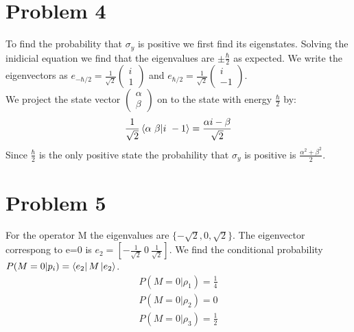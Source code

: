 \documentclass[a4paper,12pt]{article}
\numberwithin{equation}{section}
\begin{document}
\section{Problem 4}
To find the probability that $\sigma_y$ is positive we first find its eigenstates.
Solving the inidicial equation we find that the eigenvalues are $\pm\frac{\hbar}{2}$ as expected.
We write the eigenvectors as $e_{-\hbar/2}=\frac{1}{\sqrt{2}}\left( \begin{smallmatrix}i\\1\end{smallmatrix} \right)$
and $e_{\hbar/2}=\frac{1}{\sqrt{2}}\left( \begin{smallmatrix}i\\-1\end{smallmatrix} \right)$.\\
We project the state vector $\left( \begin{smallmatrix}\alpha\\ \beta \end{smallmatrix} \right)$ 
on to the state with energy $\frac{\hbar}{2}$ by:
\begin{gather}
 \frac{1}{\sqrt{2}}\braket{\alpha\ \beta | i\ -1}=\frac{\alpha i-\beta}{\sqrt{2}}
\end{gather}
Since $\frac{\hbar}{2}$ is the only positive state the probahility that $\sigma_y$ is positive is $\frac{\alpha^2+\beta^2}{2}$.

\section{Problem 5}
For the operator M the eigenvalues are $\{-\sqrt{2}, 0, \sqrt{2} \}$.
The eigenvector correspong to e=0 is $e_2=[-\frac{1}{\sqrt{2}}\ 0\ \frac{1}{\sqrt{2}}]$.
We find the conditional probability $P(M=0|p_i)=\bra{e_2}M\ket{e_2}$.\\
\begin{gather}
 P(M=0| \rho_1)=\frac{1}{4}\\
 P(M=0| \rho_2)=0\\
 P(M=0| \rho_3)=\frac{1}{2}
\end{gather}
\end{document}
